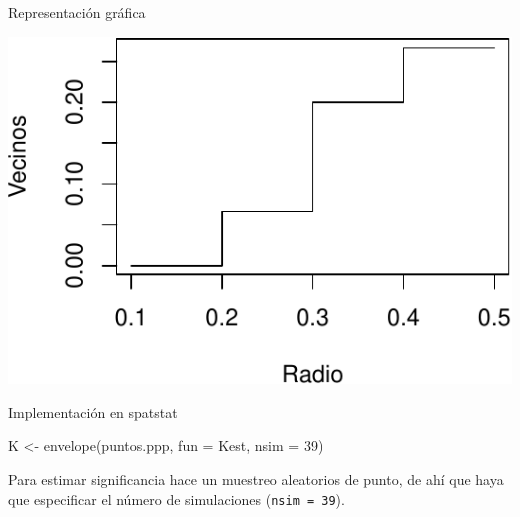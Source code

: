 \documentclass[
  11pt,
  ignorenonframetext,
]{beamer}
\newenvironment{Shaded}{}{}
\newcommand{\AttributeTok}[1]{\textcolor[rgb]{0.49,0.56,0.16}{#1}}
\newcommand{\DecValTok}[1]{\textcolor[rgb]{0.25,0.63,0.44}{#1}}
\newcommand{\FunctionTok}[1]{\textcolor[rgb]{0.02,0.16,0.49}{#1}}
\newcommand{\NormalTok}[1]{#1}
\newcommand{\OtherTok}[1]{\textcolor[rgb]{0.00,0.44,0.13}{#1}}
\begin{document}
\begin{frame}{Representación gráfica}
\protect\hypertarget{representaciuxf3n-gruxe1fica}{}
\begin{center}\includegraphics{Tutorial-spatstat-2_files/figure-beamer/unnamed-chunk-7-1} \end{center}
\end{frame}

\begin{frame}[fragile]{Implementación en spatstat}
\protect\hypertarget{implementaciuxf3n-en-spatstat}{}
\begin{Shaded}
\begin{Highlighting}[]
\NormalTok{K }\OtherTok{\textless{}{-}} \FunctionTok{envelope}\NormalTok{(puntos.ppp, }\AttributeTok{fun =}\NormalTok{ Kest, }\AttributeTok{nsim =} \DecValTok{39}\NormalTok{)}
\end{Highlighting}
\end{Shaded}

Para estimar significancia hace un muestreo aleatorios de punto, de ahí
que haya que especificar el número de simulaciones
(\texttt{nsim\ =\ 39}).
\end{frame}
\end{document}
